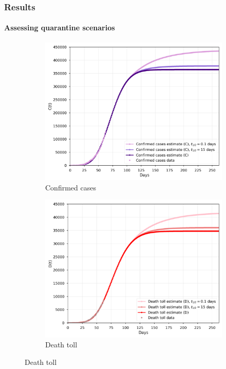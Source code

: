 \documentclass{beamer}
\begin{document}
\begin{frame}
\frametitle{Results} 
\framesubtitle{Assessing quarantine scenarios} 

	\begin{figure}
		\centering
		\caption*{Relaxation after infection peak (disease spreading under control)}
		\begin{subfigure}[t]{0.49\textwidth}
			\centering
            \includegraphics[width=\textwidth]{figs/model_prediction_mean_confirmed.png}
			\caption*{Confirmed cases}
		\end{subfigure}
		\hfill
		\begin{subfigure}[t]{0.49\textwidth}
			\centering
			\includegraphics[width=\textwidth]{figs/model_prediction_mean_dead.png}
			\caption*{Death toll}
		\end{subfigure}
	\end{figure}

\end{frame}
\end{document}
